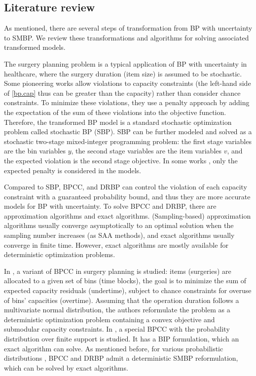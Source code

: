 \subsection{Literature review}
As mentioned, there are several steps of transformation from BP with uncertainty to SMBP. We review these transformations and algorithms for solving associated transformed models.

The surgery planning problem is a typical application of BP with uncertainty in healthcare, where the surgery duration (item size) is assumed to be stochastic. Some pioneering works
 \citep{ denton2010optimal, batun2011operating} allow violations to capacity constraints (the left-hand side of \eqref{bp.cap} thus can be greater than the capacity) rather than consider chance constraints.  To minimize these violations, they  use a penalty approach by adding the expectation of the sum of these violations into the objective function. Therefore, the transformed BP model is a standard stochastic optimization problem called stochastic BP (SBP). SBP can be further modeled and solved as a stochastic two-stage mixed-integer programming problem: the first stage variables are the bin variables $y$, the second stage variables are the item variables $v$, and the expected violation is the second stage objective.  In some works \citep{cardoen2010operating, deng2020}, only the expected penalty is considered in the models.
 
 
 
 Compared to SBP, BPCC, and DRBP can control the violation of each capacity constraint with  a guaranteed probability bound, and thus they are more accurate models for BP with uncertainty. To solve BPCC and DRBP, there are approximation algorithms  and exact algorithms. (Sampling-based) approximation algorithms usually converge  asymptotically to an optimal solution when the sampling number increases (as SAA methods), and exact algorithms usually converge in  finite time. However, exact algorithms are mostly available for deterministic optimization problems.
 
 In \cite{shylo2013}, a variant of  BPCC in surgery planning is studied:   items (surgeries) are allocated to  a  given set of bins (time blocks), the goal is to minimize the sum of expected capacity residuals (undertime), subject to chance constraints for overuse of  bins' capacities (overtime). Assuming that the operation duration follows a multivariate normal distribution, the authors reformulate the problem as a deterministic optimization problem containing a convex objective and submodular capacity constraints. In \cite{song2014chance}, a special BPCC with the probability distribution over finite support is studied. It has  a BIP formulation, which an exact algorithm can solve.  As mentioned before, for various probabilistic distributions \cite{cohen2019overcommitment,zhang2018ambiguous},  BPCC and DRBP admit a deterministic SMBP reformulation, which can be solved by exact algorithms.
 
